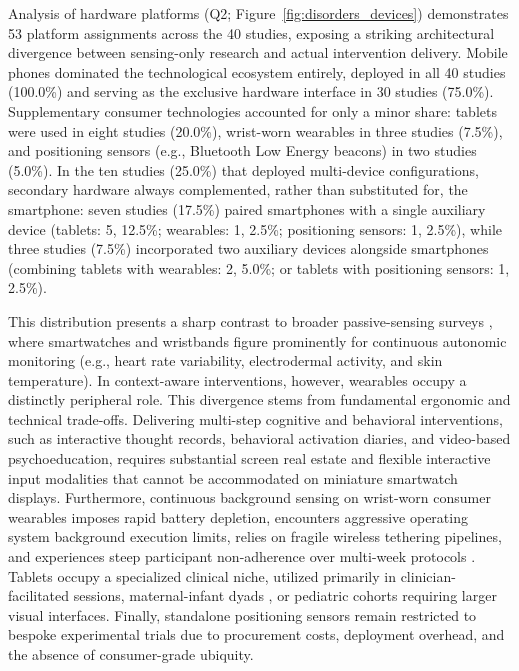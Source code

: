 Analysis of hardware platforms (Q2; Figure~\ref{fig:disorders_devices}) demonstrates 53 platform assignments across the 40 studies, exposing a striking architectural divergence between sensing-only research and actual intervention delivery. Mobile phones dominated the technological ecosystem entirely, deployed in all 40 studies (100.0\%) and serving as the exclusive hardware interface in 30 studies (75.0\%). Supplementary consumer technologies accounted for only a minor share: tablets were used in eight studies (20.0\%), wrist-worn wearables in three studies (7.5\%), and positioning sensors (e.g., Bluetooth Low Energy beacons) in two studies (5.0\%). In the ten studies (25.0\%) that deployed multi-device configurations, secondary hardware always complemented, rather than substituted for, the smartphone: seven studies (17.5\%) paired smartphones with a single auxiliary device (tablets: 5, 12.5\%; wearables: 1, 2.5\%; positioning sensors: 1, 2.5\%), while three studies (7.5\%) incorporated two auxiliary devices alongside smartphones (combining tablets with wearables: 2, 5.0\%; or tablets with positioning sensors: 1, 2.5\%).

This distribution presents a sharp contrast to broader passive-sensing surveys \cite{ometov2021, sheikh2021passivesensing, hickey2021wearablemental}, where smartwatches and wristbands figure prominently for continuous autonomic monitoring (e.g., heart rate variability, electrodermal activity, and skin temperature). In context-aware interventions, however, wearables occupy a distinctly peripheral role. This divergence stems from fundamental ergonomic and technical trade-offs. Delivering multi-step cognitive and behavioral interventions, such as interactive thought records, behavioral activation diaries, and video-based psychoeducation, requires substantial screen real estate and flexible interactive input modalities that cannot be accommodated on miniature smartwatch displays. Furthermore, continuous background sensing on wrist-worn consumer wearables imposes rapid battery depletion, encounters aggressive operating system background execution limits, relies on fragile wireless tethering pipelines, and experiences steep participant non-adherence over multi-week protocols \cite{ometov2021, hassan2025utility, jung2025key}. Tablets occupy a specialized clinical niche, utilized primarily in clinician-facilitated sessions, maternal-infant dyads \cite{joyce2026beam}, or pediatric cohorts requiring larger visual interfaces. Finally, standalone positioning sensors remain restricted to bespoke experimental trials due to procurement costs, deployment overhead, and the absence of consumer-grade ubiquity.

